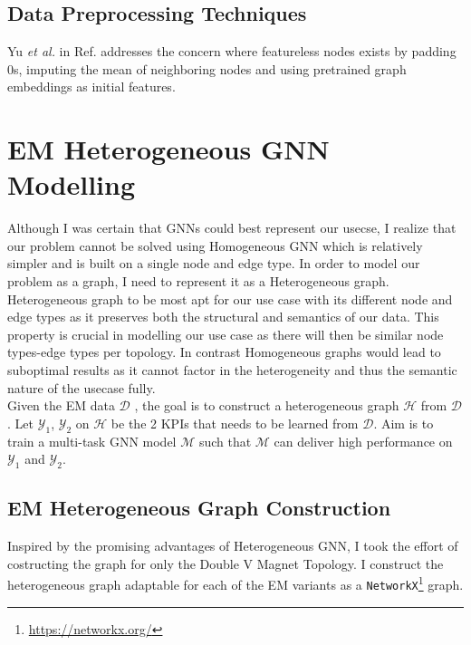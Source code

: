 \documentclass{report} %
\begin{document}
\subsection{Data Preprocessing Techniques}\label{subsec:HGNN Data Preprocessing Techniques}
Yu \textit{et al.} in Ref. \cite{SHGNN-2020} addresses the concern where featureless nodes exists by padding 0s, imputing the mean of neighboring nodes and using pretrained graph 
embeddings as initial features. 

\section{EM Heterogeneous GNN Modelling}\label{sec:EM Heterogeneous GNN Model}
Although I was certain that \ac{GNN}s could best represent our usecse, I realize that our problem cannot be solved using Homogeneous \ac{GNN} which is relatively 
simpler and is built on a single node and edge type. In order to model our problem as a graph, I need to represent it as a Heterogeneous graph. 
Heterogeneous graph to be most apt for our use case with its different node and edge types as it preserves both the structural and semantics of our data. 
This property is crucial in modelling our use case as there will then be similar node types-edge types per topology. 
In contrast Homogeneous graphs would lead to suboptimal results as it cannot factor in the heterogeneity and thus the semantic nature of the usecase fully. \\

Given the \ac{EM} data $\mathcal{D}$ , the goal is to construct a heterogeneous graph $\mathcal{H}$ from $\mathcal{D}$. Let $\mathcal{Y}_1$, $\mathcal{Y}_2$ on 
$\mathcal{H}$ be the 2 \ac{KPI}s that needs to be learned from $\mathcal{D}$. Aim is to train a multi-task \ac{GNN} model $\mathcal{M}$ such that $\mathcal{M}$ can deliver 
high performance on $\mathcal{Y}_1$ and $\mathcal{Y}_2$.

\subsection{EM Heterogeneous Graph Construction}\label{subsec:EM Heterogeneous Graph Construction}
Inspired by the promising advantages of Heterogeneous \ac{GNN}, I took the effort of costructing the graph for only the Double V Magnet Topology.
I construct the heterogeneous graph adaptable for each of the \ac{EM} variants as a \texttt{NetworkX}\footnote{\url{https://networkx.org/}} graph.
\end{document}
